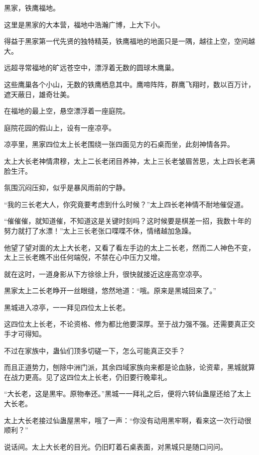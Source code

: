 
\begin{this_body}

黑家，铁鹰福地。

这里是黑家的大本营，福地中浩瀚广博，上大下小。

得益于黑家第一代先贤的独特精英，铁鹰福地的地面只是一隅，越往上空，空间越大。

远超寻常福地的旷远苍空中，漂浮着无数的圆球木鹰巢。

这些鹰巢各个小山，无数的铁鹰栖息其中。鹰啼阵阵，群鹰飞翔时，数以百万计，遮天蔽日，雄奇壮美。

在福地的最上空，悬空漂浮着一座庭院。

庭院花园的假山上，设有一座凉亭。

凉亭里，黑家四位太上长老围绕一张四面见方的石桌而坐，此刻神情各异。

太上大长老神情肃穆，太上二长老闭目养神，太上三长老皱眉苦思，太上四长老满脸生汗。

氛围沉闷压抑，似乎是暴风雨前的宁静。

“我的三长老大人，你究竟要考虑到什么时候？”太上四长老神情不耐地催促道。

“催催催，就知道催，不知道这是关键时刻吗？这时候要是棋差一招，我数十年的努力就打了水漂！”太上三长老张口喋喋不休，情绪越加急躁。

他望了望对面的太上大长老，又看了看左手边的太上二长老，然而二人神色不变，太上三长老瞧不出任何端倪，不禁在心中压力又增。

就在这时，一道身影从下方徐徐上升，很快就接近这座高空凉亭。

黑家太上二长老睁开一丝眼缝，悠然地道：“哦。原来是黑城回来了。”

黑城进入凉亭，一一拜见四位太上长老。

这四位太上长老，不论资格、修为都比他要深厚。至于战力强不强。还需要真正交手才可得知。

不过在家族中，蛊仙们顶多切磋一下，怎么可能真正交手？

而且正道势力，刨除中洲门派，其余四域家族向来都是论血脉，论资辈，黑城就算在战力更高。见了这四位太上长老，仍旧要行晚辈礼。

“大长老，这是黑牢。原物奉还。”黑城一一拜礼之后，便将六转仙蛊屋还给了太上大长老。

太上大长老接过仙蛊屋黑牢，哦了一声：“你没有动用黑牢啊，看来这一次行动很顺利？”

说话间。太上大长老的目光。仍旧盯着石桌表面，对黑城只是随口问问。


\end{this_body}
